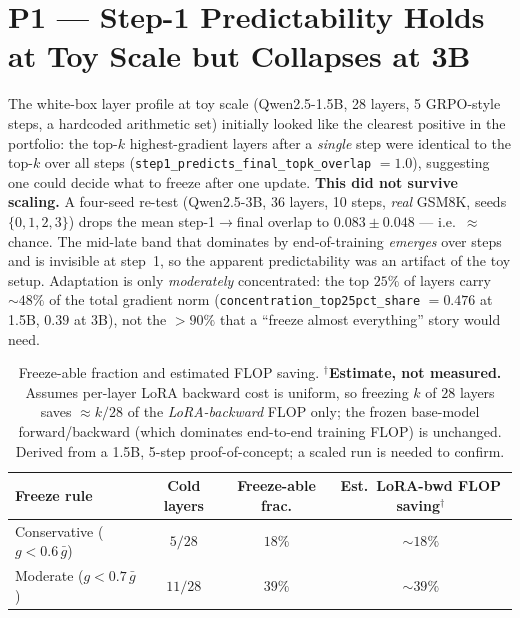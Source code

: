 \documentclass[12pt,a4paper]{report}
\begin{document}
\section{P1 --- Step-1 Predictability Holds at Toy Scale but Collapses at 3B}
\label{sec:p1}

The white-box layer profile at toy scale (Qwen2.5-1.5B, 28 layers, 5 GRPO-style
steps, a hardcoded arithmetic set) initially looked like the clearest positive in
the portfolio: the top-$k$ highest-gradient layers after a \emph{single} step were
identical to the top-$k$ over all steps
(\texttt{step1\_predicts\_final\_topk\_overlap} $=1.0$), suggesting one could decide
what to freeze after one update. \textbf{This did not survive scaling.} A four-seed
re-test (Qwen2.5-3B, 36 layers, 10 steps, \emph{real} GSM8K, seeds
$\{0,1,2,3\}$) drops the mean step-1$\to$final overlap to
$0.083\pm0.048$ --- i.e.\ ${\approx}$chance. The mid-late band that dominates by end-of-training
\emph{emerges} over steps and is invisible at step~1, so the apparent predictability
was an artifact of the toy setup. Adaptation is only \emph{moderately} concentrated:
the top $25\%$ of layers carry ${\sim}48\%$ of the total gradient norm
(\texttt{concentration\_top25pct\_share} $=0.476$ at 1.5B, $0.39$ at 3B), not the
$>90\%$ that a ``freeze almost everything'' story would need.

\begin{table}[h]
\centering
\small
\begin{tabular}{lccc}
\toprule
Freeze rule & Cold layers & Freeze-able frac. & Est.\ LoRA-bwd FLOP saving$^{\dagger}$ \\
\midrule
Conservative ($g<0.6\,\bar{g}$) & $5/28$  & $18\%$ & $\sim\!18\%$ \\
Moderate ($g<0.7\,\bar{g}$)     & $11/28$ & $39\%$ & $\sim\!39\%$ \\
\bottomrule
\end{tabular}
\caption{Freeze-able fraction and estimated FLOP saving. $^{\dagger}$\textbf{Estimate,
not measured.} Assumes per-layer LoRA backward cost is uniform, so freezing $k$ of
$28$ layers saves $\approx k/28$ of the \emph{LoRA-backward} FLOP only; the frozen
base-model forward/backward (which dominates end-to-end training FLOP) is unchanged.
Derived from a 1.5B, 5-step proof-of-concept; a scaled run is needed to confirm.}
\label{tab:p1-freeze-estimate}
\end{table}
\end{document}
